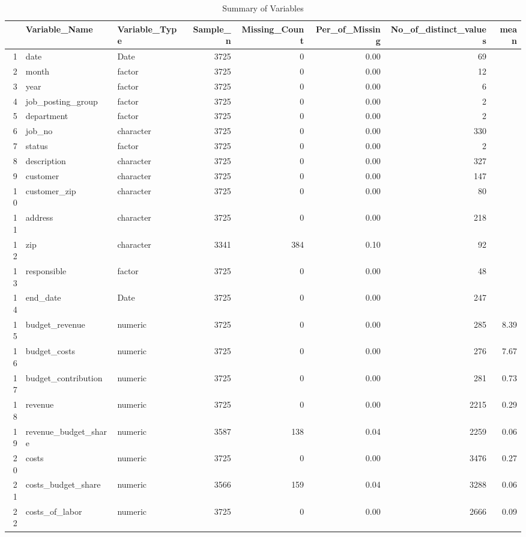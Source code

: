 \begin{sidewaystable}[ht]
\centering
\caption{Summary of Variables} 
\begin{tabular}{rllrrrrr}
  \hline
 & Variable\_Name & Variable\_Type & Sample\_n & Missing\_Count & Per\_of\_Missing & No\_of\_distinct\_values & mean \\ 
  \hline
1 & date & Date & 3725 &   0 & 0.00 &  69 &  \\ 
  2 & month & factor & 3725 &   0 & 0.00 &  12 &  \\ 
  3 & year & factor & 3725 &   0 & 0.00 &   6 &  \\ 
  4 & job\_posting\_group & factor & 3725 &   0 & 0.00 &   2 &  \\ 
  5 & department & factor & 3725 &   0 & 0.00 &   2 &  \\ 
  6 & job\_no & character & 3725 &   0 & 0.00 & 330 &  \\ 
  7 & status & factor & 3725 &   0 & 0.00 &   2 &  \\ 
  8 & description & character & 3725 &   0 & 0.00 & 327 &  \\ 
  9 & customer & character & 3725 &   0 & 0.00 & 147 &  \\ 
  10 & customer\_zip & character & 3725 &   0 & 0.00 &  80 &  \\ 
  11 & address & character & 3725 &   0 & 0.00 & 218 &  \\ 
  12 & zip & character & 3341 & 384 & 0.10 &  92 &  \\ 
  13 & responsible & factor & 3725 &   0 & 0.00 &  48 &  \\ 
  14 & end\_date & Date & 3725 &   0 & 0.00 & 247 &  \\ 
  15 & budget\_revenue & numeric & 3725 &   0 & 0.00 & 285 & 8.39 \\ 
  16 & budget\_costs & numeric & 3725 &   0 & 0.00 & 276 & 7.67 \\ 
  17 & budget\_contribution & numeric & 3725 &   0 & 0.00 & 281 & 0.73 \\ 
  18 & revenue & numeric & 3725 &   0 & 0.00 & 2215 & 0.29 \\ 
  19 & revenue\_budget\_share & numeric & 3587 & 138 & 0.04 & 2259 & 0.06 \\ 
  20 & costs & numeric & 3725 &   0 & 0.00 & 3476 & 0.27 \\ 
  21 & costs\_budget\_share & numeric & 3566 & 159 & 0.04 & 3288 & 0.06 \\ 
  22 & costs\_of\_labor & numeric & 3725 &   0 & 0.00 & 2666 & 0.09 \\ 

\end{tabular}
\end{sidewaystable}
